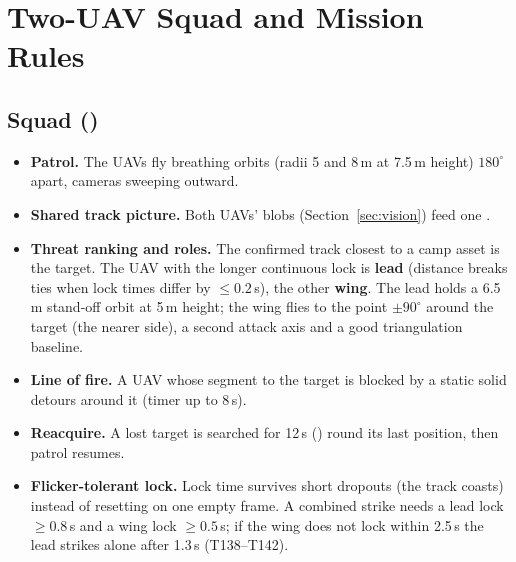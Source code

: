 \section{Two-UAV Squad and Mission Rules}\label{sec:squad}
\subsection{Squad ()}
\begin{itemize}
  \item \textbf{Patrol.} The UAVs fly breathing orbits (radii 5 and 8\,m at 7.5\,m height) $180^\circ$ apart, cameras sweeping outward.
  \item \textbf{Shared track picture.} Both UAVs' blobs (Section~\ref{sec:vision}) feed one .
  \item \textbf{Threat ranking and roles.} The confirmed track closest to a camp asset is the target. The UAV with the longer continuous lock is \textbf{lead} (distance breaks ties when lock times differ by $\le0.2$\,s), the other \textbf{wing}. The lead holds a 6.5\,m stand-off orbit at 5\,m height; the wing flies to the point $\pm90^\circ$ around the target (the nearer side), a second attack axis and a good triangulation baseline.
  \item \textbf{Line of fire.} A UAV whose segment to the target is blocked by a static solid detours around it (timer up to 8\,s).
  \item \textbf{Reacquire.} A lost target is searched for 12\,s () round its last position, then patrol resumes.
  \item \textbf{Flicker-tolerant lock.} Lock time survives short dropouts (the track coasts) instead of resetting on one empty frame. A combined strike needs a lead lock $\ge0.8$\,s and a wing lock $\ge0.5$\,s; if the wing does not lock within 2.5\,s the lead strikes alone after 1.3\,s (T138--T142).
\end{itemize}

